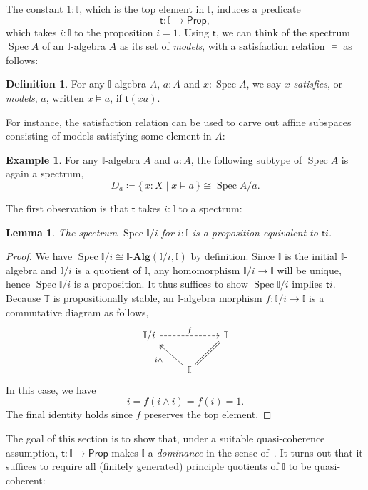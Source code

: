 \documentclass[12pt]{amsart}
\newtheorem{lemma}[theorem]{Lemma}
\theoremstyle{definition}
\newtheorem{example}[theorem]{Example}
\newtheorem{definition}[theorem]{Definition}
\newcommand{\mb}[1]{\mathbf{#1}}
\newcommand{\mbb}[1]{\mathbb{#1}}
\newcommand{\T}{\mbb T}
\newcommand{\I}{\mbb I}
\newcommand{\ms}[1]{\mathsf{#1}}
\newcommand{\alg}{\text{-}\mb{Alg}}
\newcommand{\scomp}[2]{\{\,#1\mid#2\,\}}
\newcommand{\pp}{\ms{Prop}}
\newcommand{\spec}{\operatorname{Spec}}
\begin{document}
The constant $1 : \I$, which is the top element in $\I$, induces a predicate
\[ \ms t \colon \I \to \pp, \]
which takes $i : \I$ to the proposition $i = 1$. Using $\ms t$, we can think of the spectrum $\spec A$ of an $\I$-algebra $A$ as its set of \emph{models}, with a satisfaction relation $\models$ as follows:

\begin{definition}
  For any $\I$-algebra $A$, $a:A$ and $x:\spec A$, we say $x$ \emph{satisfies}, or \emph{models}, $a$, written $x \models a$, if $\ms t(xa)$.
\end{definition}

For instance, the satisfaction relation can be used to carve out affine subspaces consisting of models satisfying some element in $A$:

\begin{example}
  For any $\I$-algebra $A$ and $a:A$, the following subtype of $\spec A$ is again a spectrum,
  \[ D_a \coloneq \scomp{x : X}{x \models a} \cong \spec A/a. \]
\end{example}

The first observation is that $\ms t$ takes $i : \I$ to a spectrum:

\begin{lemma}\label{lem:openpropaffine}
  The spectrum $\spec\I/i$ for $i:\I$ is a proposition equivalent to $\ms ti$.
\end{lemma}
\begin{proof}
  We have $\spec \I/i \cong \I\alg(\I/i,\I)$ by definition. Since $\I$ is the initial $\I$-algebra and $\I/i$ is a quotient of $\I$, any homomorphism $\I/i \to \I$ will be unique, hence $\spec\I/i$ is a proposition. It thus suffices to show $\spec\I/i$ implies $\ms ti$. Because $\T$ is propositionally stable, an $\I$-algebra morphism $f \colon \I/i \to \I$ is a commutative diagram as follows,
  \[
  \begin{tikzcd}
    \I/i \ar[rr, dashed, "f"] & & \I \\ 
    & \I \ar[ul, two heads, "i \wedge -"] \ar[ur, equal]
  \end{tikzcd}
  \]
  In this case, we have
  \[ i = f(i \wedge i) = f(i) = 1. \]
  The final identity holds since $f$ preserves the top element. 
\end{proof}

The goal of this section is to show that, under a suitable quasi-coherence assumption, $\ms t \colon \I \to \pp$ makes $\I$ a \emph{dominance} in the sense of~\cite{rosolini1986continuity}. It turns out that it suffices to require all (finitely generated) principle quotients of $\I$ to be quasi-coherent:
\end{document}
